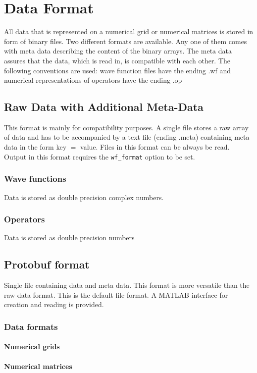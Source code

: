 \documentclass[a4paper,12pt]{scrbook}
\begin{document}
\chapter{Data Format}
All data that is represented on a numerical grid
or numerical matrices is stored in form of binary files.
Two different formats are available. Any one of them
comes with meta data describing the content of the
binary arrays. The meta data assures that the data,
which is read in, is compatible with each other.
The following conventions are used: wave function
files have the ending .wf and numerical
representations of operators have the ending .op

\section{Raw Data with Additional Meta-Data}
This format is mainly for compatibility purposes.
A single file stores a raw array of data
and has to be accompanied by a text file (ending .meta)
containing meta data in the form key $=$ value.
Files in this format can be always be read. Output
in this format requires the \texttt{wf\_format}
option to be set.

\subsection{Wave functions}
Data is stored as double precision complex numbers.

\subsection{Operators}
Data is stored as double precision numbers

\section{Protobuf format}
Single file containing data and meta data.
This format is more versatile than the raw data format. This is the default file format.
A MATLAB interface for creation and reading is provided.

\subsection{Data formats}
\subsubsection{Numerical grids}
\subsubsection{Numerical matrices}
\end{document}

